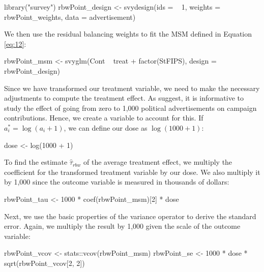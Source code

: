 \begin{Schunk}
\begin{Sinput}
library("survey")
rbwPoint_design <- svydesign(ids = ~ 1,
                             weights = ~ rbwPoint_weights,
                             data = advertisement)
\end{Sinput}
\end{Schunk}

We then use the residual balancing weights to fit the MSM defined in
Equation \ref{eq:12}:

\begin{Schunk}
\begin{Sinput}
rbwPoint_msm <- svyglm(Cont ~ treat + factor(StFIPS),
                       design = rbwPoint_design)
\end{Sinput}
\end{Schunk}

Since we have transformed our treatment variable, we need to make the
necessary adjustments to compute the treatment effect. As
\citet{urbanDollarsSidewalkShould2014a} suggest, it is informative to
study the effect of going from zero to 1,000 political advertisements on
campaign contributions. Hence, we create a  variable to
account for this. If \(a_{i}^{*}=\log(a_{i}+1)\), we can define our dose
as \(\log(1000+1)\):

\begin{Schunk}
\begin{Sinput}
dose <- log(1000 + 1)
\end{Sinput}
\end{Schunk}

To find the estimate \(\hat{\tau}_{rbw}\) of the average treatment
effect, we multiply the coefficient for the transformed treatment
variable by our dose. We also multiply it by 1,000 since the outcome
variable is measured in thousands of dollars:

\begin{Schunk}
\begin{Sinput}
rbwPoint_tau <- 1000 * coef(rbwPoint_msm)[2] * dose
\end{Sinput}
\end{Schunk}

Next, we use the basic properties of the variance operator to derive the
standard error. Again, we multiply the result by 1,000 given the scale
of the outcome variable:

\begin{Schunk}
\begin{Sinput}
rbwPoint_vcov <- stats::vcov(rbwPoint_msm)
rbwPoint_se <- 1000 * dose * sqrt(rbwPoint_vcov[2, 2]) 
\end{Sinput}
\end{Schunk}

